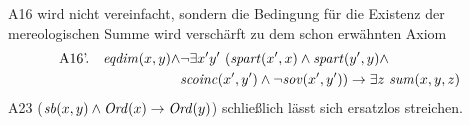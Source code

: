 %
A16 wird nicht vereinfacht, sondern die Bedingung für die Existenz der mereologischen Summe wird verschärft zu dem schon erwähnten Axiom
\begin{align*}
 \text{A16'.} \quad \Geqdim(x,y) \wedge &\neg \exists x'y'\ (\Gspart(x',x) \wedge \Gspart(y',y) \wedge \\
 &\Gscoinc(x',y') \wedge \neg \Gsov(x',y')) \to \exists z\ \Gsum(x,y,z)
\end{align*}
%
A23 ($\mathit{sb}(x,y) \wedge \mathit{Ord}(x) \to \mathit{Ord}(y)$) schließlich lässt sich ersatzlos streichen.
